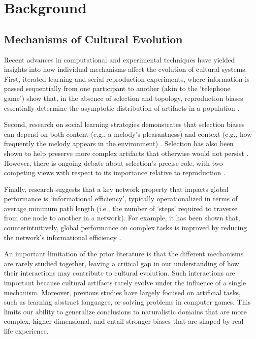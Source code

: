 \documentclass[10pt,letterpaper]{article}
\begin{document}
\section{Background}
\subsection{Mechanisms of Cultural Evolution}

Recent advances in computational and experimental techniques have yielded insights into how individual mechanisms affect the evolution of cultural systems. First, iterated learning and serial reproduction experiments, where information is passed sequentially from one participant to another (akin to the `telephone game') show that, in the absence of selection and topology, reproduction biases essentially determine the asymptotic distribution of artifacts in a population \cite{kalish2007iterated,xu2010rational,kirby2014iterated,jacoby2024commonality}.  

Second, research on social learning strategies demonstrates that selection biases can depend on both content (e.g., a melody’s pleasantness) and context (e.g., how frequently the melody appears in the environment) \cite{kendal2018social}. Selection has also been shown to help preserve more complex artifacts that otherwise would not persist \cite{thompson2022complex}. However, there is ongoing debate about selection’s precise role, with two competing views with respect to its importance relative to reproduction \cite{mesoudi2021cultural}.

Finally, research suggests that a key network property that impacts global performance is ‘informational efficiency’, typically operationalized in terms of average minimum path length \cite{centola2022network} (i.e., the number of ‘steps’ required to traverse from one node to another in a network). For example, it has been shown that, counterintuitively, global performance on complex tasks is improved by reducing the network’s informational efficiency \cite{derex2016partial}. 

An important limitation of the prior literature is that the different mechanisms are rarely studied together, leaving a critical gap in our understanding of how their interactions may contribute to cultural evolution. Such interactions are important because cultural artifacts rarely evolve under the influence of a single mechanism. Moreover, previous studies have largely focused on artificial tasks, such as learning abstract languages, or solving problems in computer games. This limits our ability to generalize conclusions to naturalistic domains that are more complex, higher dimensional, and entail stronger biases that are shaped by real-life experience.
\end{document}
